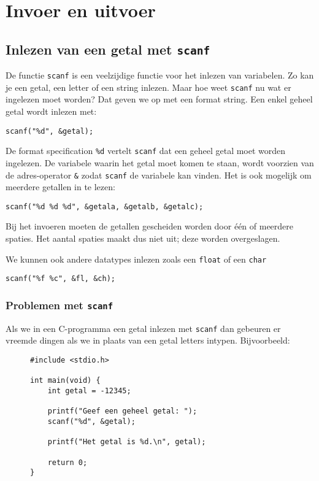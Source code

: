 \chapter{Invoer en uitvoer}
\label{cha:io}
\thispagestyle{empty}

\section{Inlezen van een getal met \texttt{scanf}}
\label{sec:scanf}
De functie \texttt{scanf} is een veelzijdige functie voor het inlezen van variabelen. Zo kan je een getal, een letter of een string inlezen. Maar hoe weet \texttt{scanf} nu wat er ingelezen moet worden? Dat geven we op met een format string. Een enkel geheel getal wordt inlezen met:

\hspace*{1em}\texttt{scanf("\%d", \&getal);}

De format specification \texttt{\%d} vertelt \texttt{scanf} dat een geheel getal moet worden ingelezen. De variabele waarin het getal moet komen te staan, wordt voorzien van de adres-operator \texttt{\&} zodat \texttt{scanf} de variabele kan vinden.
Het is ook mogelijk om meerdere getallen in te lezen:

\hspace*{1em}\texttt{scanf("\%d \%d \%d", \&getala, \&getalb, \&getalc);}

Bij het invoeren moeten de getallen gescheiden worden door \'e\'en of meerdere spaties. Het aantal spaties maakt dus niet uit; deze worden overgeslagen.

We kunnen ook andere datatypes inlezen zoals een \texttt{float} of een \texttt{char}

\hspace*{1em}\texttt{scanf("\%f \%c", \&fl, \&ch);}





\subsection{Problemen met \texttt{scanf}}

Als we in een C-programma een getal inlezen met \lstinline|scanf| dan gebeuren er vreemde dingen als we in plaats van een getal letters intypen. Bijvoorbeeld:

\begin{figure}[H]
\begin{lstlisting}[caption=Getal inlezen met \texttt{scanf}.]
#include <stdio.h>

int main(void) {
    int getal = -12345;

    printf("Geef een geheel getal: ");
    scanf("%d", &getal);

    printf("Het getal is %d.\n", getal);

    return 0;
}
\end{lstlisting}
\end{figure}

